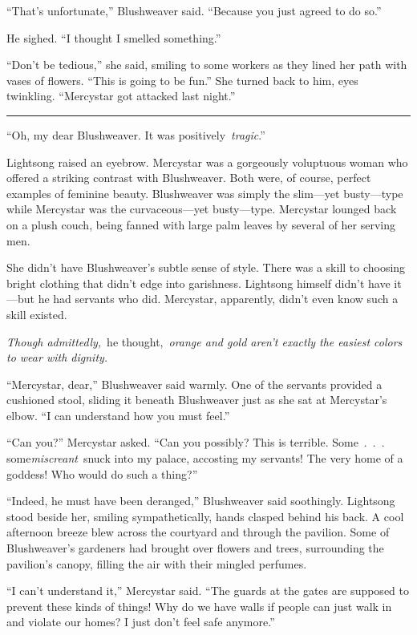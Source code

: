 “That’s unfortunate,” Blushweaver said. “Because you just agreed to do so.”

He sighed. “I thought I smelled something.”

“Don’t be tedious,” she said, smiling to some workers as they lined her path with vases of flowers. “This is going to be fun.” She turned back to him, eyes twinkling. “Mercystar got attacked last night.”

\bigskip \hrule \bigskip

“Oh, my dear Blushweaver. It was positively~\textit{tragic}.”

Lightsong raised an eyebrow. Mercystar was a gorgeously voluptuous woman who offered a striking contrast with Blushweaver. Both were, of course, perfect examples of feminine beauty. Blushweaver was simply the slim—yet busty—type while Mercystar was the curvaceous—yet busty—type. Mercystar lounged back on a plush couch, being fanned with large palm leaves by several of her serving men.

She didn’t have Blushweaver’s subtle sense of style. There was a skill to choosing bright clothing that didn’t edge into garishness. Lightsong himself didn’t have it—but he had servants who did. Mercystar, apparently, didn’t even know such a skill existed.

\textit{Though admittedly,}~he thought,~\textit{orange and gold aren’t exactly the easiest colors to wear with dignity.}

“Mercystar, dear,” Blushweaver said warmly. One of the servants provided a cushioned stool, sliding it beneath Blushweaver just as she sat at Mercystar’s elbow. “I can understand how you must feel.”

“Can you?” Mercystar asked. “Can you possibly? This is terrible. Some~.~.~. some\textit{miscreant}~snuck into my palace, accosting my servants! The very home of a goddess! Who would do such a thing?”

“Indeed, he must have been deranged,” Blushweaver said soothingly. Lightsong stood beside her, smiling sympathetically, hands clasped behind his back. A cool afternoon breeze blew across the courtyard and through the pavilion. Some of Blushweaver’s gardeners had brought over flowers and trees, surrounding the pavilion’s canopy, filling the air with their mingled perfumes.

“I can’t understand it,” Mercystar said. “The guards at the gates are supposed to prevent these kinds of things! Why do we have walls if people can just walk in and violate our homes? I just don’t feel safe anymore.”

